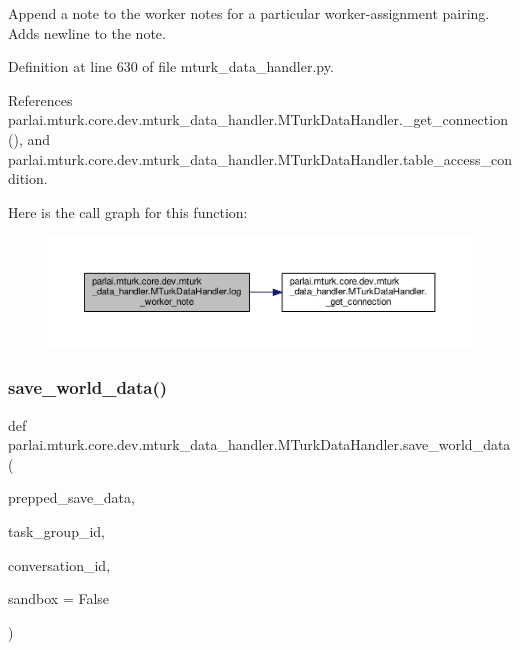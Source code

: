 \begin{DoxyVerb}Append a note to the worker notes for a particular worker-assignment
pairing. Adds newline to the note.
\end{DoxyVerb}
 

Definition at line 630 of file mturk\+\_\+data\+\_\+handler.\+py.



References parlai.\+mturk.\+core.\+dev.\+mturk\+\_\+data\+\_\+handler.\+M\+Turk\+Data\+Handler.\+\_\+get\+\_\+connection(), and parlai.\+mturk.\+core.\+dev.\+mturk\+\_\+data\+\_\+handler.\+M\+Turk\+Data\+Handler.\+table\+\_\+access\+\_\+condition.

Here is the call graph for this function\+:
\nopagebreak
\begin{figure}[H]
\begin{center}
\leavevmode
\includegraphics[width=350pt]{classparlai_1_1mturk_1_1core_1_1dev_1_1mturk__data__handler_1_1MTurkDataHandler_acb69b500f70e42e4e8a99e224534cc27_cgraph}
\end{center}
\end{figure}
\mbox{\label{classparlai_1_1mturk_1_1core_1_1dev_1_1mturk__data__handler_1_1MTurkDataHandler_a6d5a47cdeede36a2fb650f28dd72ef12}} 
\subsubsection{\texorpdfstring{save\+\_\+world\+\_\+data()}{save\_world\_data()}}
{\footnotesize\ttfamily def parlai.\+mturk.\+core.\+dev.\+mturk\+\_\+data\+\_\+handler.\+M\+Turk\+Data\+Handler.\+save\+\_\+world\+\_\+data (\begin{DoxyParamCaption}\item[{}]{prepped\+\_\+save\+\_\+data,  }\item[{}]{task\+\_\+group\+\_\+id,  }\item[{}]{conversation\+\_\+id,  }\item[{}]{sandbox = {\ttfamily False} }\end{DoxyParamCaption})\hspace{0.3cm}{\ttfamily [static]}}



